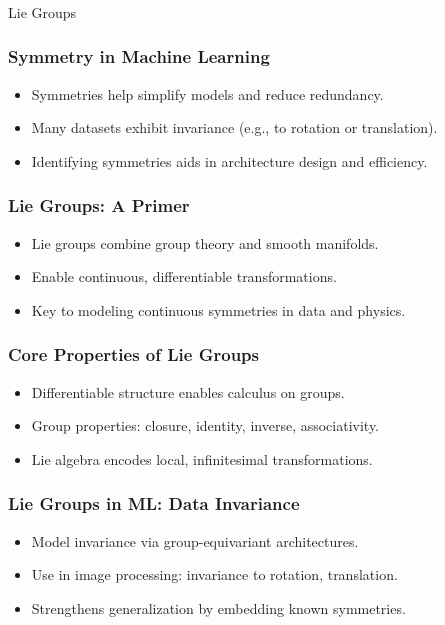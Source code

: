 \begin{frame}[fragile]\frametitle{}
\begin{center}
{\Large Lie Groups}
\end{center}
\end{frame}

\begin{frame}[fragile]\frametitle{Symmetry in Machine Learning}
  \begin{itemize}
    \item Symmetries help simplify models and reduce redundancy.
    \item Many datasets exhibit invariance (e.g., to rotation or translation).
    \item Identifying symmetries aids in architecture design and efficiency.
  \end{itemize}
\end{frame}

\begin{frame}[fragile]\frametitle{Lie Groups: A Primer}
  \begin{itemize}
    \item Lie groups combine group theory and smooth manifolds.
    \item Enable continuous, differentiable transformations.
    \item Key to modeling continuous symmetries in data and physics.
  \end{itemize}
\end{frame}

\begin{frame}[fragile]\frametitle{Core Properties of Lie Groups}
  \begin{itemize}
    \item Differentiable structure enables calculus on groups.
    \item Group properties: closure, identity, inverse, associativity.
    \item Lie algebra encodes local, infinitesimal transformations.
  \end{itemize}
\end{frame}

\begin{frame}[fragile]\frametitle{Lie Groups in ML: Data Invariance}
  \begin{itemize}
    \item Model invariance via group-equivariant architectures.
    \item Use in image processing: invariance to rotation, translation.
    \item Strengthens generalization by embedding known symmetries.
  \end{itemize}
\end{frame}

